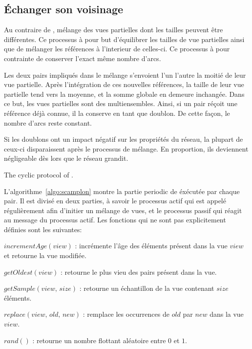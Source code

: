 \subsection{Échanger son voisinage}

Au contraire de \CYCLON, \SPRAY mélange des vues partielles dont les tailles
peuvent être différentes. Ce processus à pour but d'équilibrer les tailles de
vue partielles ainsi que de mélanger les références à l'interieur de celles-ci.
Ce processus à pour contrainte de conserver l'exact même nombre d'arcs.

Les deux pairs impliqués dans le mélange s'envoient l'un l'autre la moitié de
leur vue partielle. Après l'intégration de ces nouvelles références, la taille
de leur vue partielle tend vers la moyenne, et la somme globale en demeure
inchangée. Dans ce but, les vues partielles sont des multiensembles. Ainsi, si
un pair réçoit une référence déjà connue, il la conserve en tant que doublon.
De cette façon, le nombre d'arcs reste constant.

Si les doublons ont un impact négatif sur les propriétés du réseau, la plupart
de ceux-ci disparaissent après le processus de mélange. En proportion, ils
deviennent négligeable dès lors que le réseau grandit.

\begin{algorithm}[h]
  
  \caption{\label{algo:scamplon}The cyclic protocol of \SPRAY.}
\end{algorithm}

L'algorithme~\ref{algo:scamplon} montre la partie periodic de \SPRAY éxécutée
par chaque pair. Il est divisé en deux parties, à savoir le processus actif qui
est appelé régulièrement afin d'initier un mélange de vues, et le processus
passif qui réagit au message du processus actif. Les fonctions qui ne sont pas
explicitement définies sont les suivantes:
\begin{compactitem}
\item $incrementAge(view)$ : incrémente l'âge des éléments présent dans la vue
  $view$ et retourne la vue modifiée.
\item $getOldest(view)$ : retourne le plus vieu des pairs présent dans la vue.
\item $getSample(view,\, size)$ : retourne un échantillon de la vue contenant $size$
  éléments.
\item $replace(view,\,old,\,new)$ : remplace les occurrences de $old$ par $new$ dans
  la vue $view$.
\item $rand()$ : retourne un nombre flottant aléatoire entre $0$ et $1$.
\end{compactitem}

